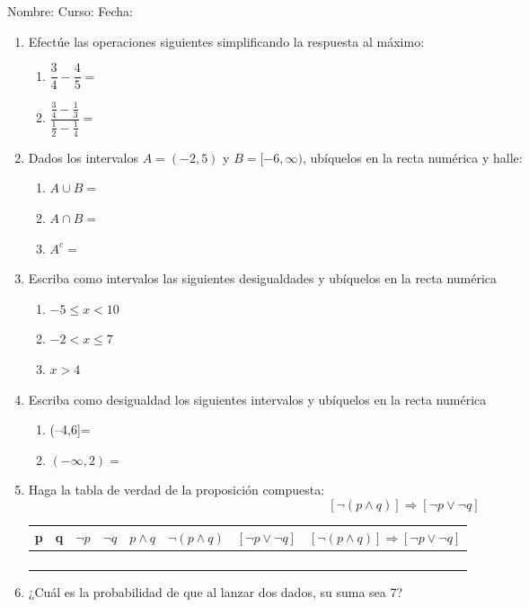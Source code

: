 \documentclass[letterpaper,fleqn]{article}
\newcommand{\LineaNombre}{%
\par
\vspace{\baselineskip}
Nombre:\hrulefill \; Curso: \underline{\hspace*{48pt}} \; Fecha: \underline{\hspace*{2.5cm}} \relax
\par}
\begin{document}
\LineaNombre
\begin{enumerate}
 \item Efectúe las operaciones siguientes simplificando la respuesta al máximo:
 \begin{enumerate}
 \item $\dfrac{3}{4}-\dfrac{4}{5}=$\noanswer
 \item $\dfrac{\frac{3}{4}-\frac{1}{3}}{\frac{1}{2}-\frac{1}{4}}=$\noanswer
 \end{enumerate}
\item Dados los intervalos $A=(-2,5)$ y $B=[-6,\infty)$, ubíquelos en la recta numérica y halle:
\begin{enumerate}
\item $A\cup B=$ \noanswer
\item $A \cap B=$ \noanswer
\item $A^{c}=$ \noanswer
\end{enumerate}
\item Escriba como intervalos las siguientes desigualdades y ubíquelos en la recta numérica
\begin{enumerate}
\item $-5\leq x<10$\noanswer
\newpage
\item $-2<x \leq7$\noanswer
\item $x>4$\noanswer
\end{enumerate}
\item Escriba como desigualdad los siguientes intervalos y ubíquelos en la recta numérica
\begin{enumerate}
\item (--4,6]= \noanswer
\item $(-\infty,2)=$ \noanswer
\end{enumerate}
\item Haga la tabla de verdad de la proposición compuesta:
\[[\neg(p\wedge q)]\Rightarrow [\neg p \vee \neg q]\]
\begin{tabular}{|c|c|c|c|c|c|c|c|}
\hline 
p & q & $\neg p$ & $\neg q$ & $p\wedge q$ & $\neg (p\wedge q)$ & $[\neg p \vee \neg q] $& $[\neg(p\wedge q)]\Rightarrow [\neg p \vee \neg q]$  \\ 
\hline 
 &  &  &  &  &  &  &  \\ 
\hline 
 &  &  &  &  &  &  &  \\ 
\hline 
 &  &  &  &  &  &  &  \\ 
\hline 
 &  &  &  &  &  &  &  \\ 
\hline 
\end{tabular} 
\item ¿Cuál es la probabilidad de que al lanzar dos dados, su suma sea 7?\noanswer
 \end{enumerate}
\end{document}
